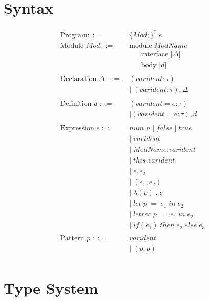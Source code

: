 \documentclass[10pt,a4paper,draft]{article}
\begin{document}
\begin{flushleft}
\section{Syntax}

\newcommand{\longspace}{\;\;\;\;\;\;}
\begin{align*}
\text{Program} ::= \; & \lbrace Mod;\rbrace^{*}\;e\\
\text{Module } Mod ::= \; &\text{module}\; ModName \;\\ 
&\longspace \text{interface [}  \Delta \text{]}\\
&\longspace \text{body [} d \text{]}\\ 
\\
\text{Declaration } \Delta \; ::=\; &(varident:\tau)\\
&|\; (varident:\tau), \Delta \\ 
\\
\text{Definition } d \; ::= \; & (varident=e : \tau)\\
&| (varident=e:\tau), d\\
\\
\text{Expression }e \; ::= \; &num \; n \; | \; false \; | \; true \\
&|\;varident  \\
&|\;ModName.varident \\
&|\;this.varident \\
&|\;e_{1}e_{2} \\
&|\;(e_{1},e_{2}) \\
&|\;\lambda(p)\;.\;e \\
&|\;let \; p \; = \; e_{1} \; in \; e_{2} \\
&|\;letrec \; p \; = \; e_{1} \; in \; e_{2} \\
&|\; if(e_{1}) \; then \; e_{2} \; else \; e_{3}\\
\\
\text{Pattern }p \; ::= \; &varident \\
&| \; (p,p)\\
\end{align*}

\section{Type System}


\end{flushleft}
\end{document}
